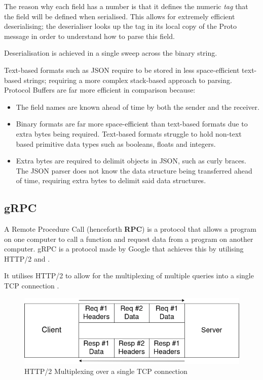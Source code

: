 \documentclass[a4paper,12pt]{report}
\begin{document}
The reason why each field has a number is that it defines the numeric \textit{tag} that the field will be defined when serialised.
This allows for extremely efficient deserialising; the deserialiser looks up the tag in its local copy of the Proto message in order
to understand how to parse this field. 

Deserialisation is achieved in a single sweep across the binary string.

Text-based formats such as JSON \cite{json} require to be stored in less space-efficient text-based strings; requiring a more complex stack-based approach to parsing. 
Protocol Buffers are far more efficient in comparison because:

\begin{itemize}
    \item The field names are known ahead of time by both the sender and the receiver.
    \item Binary formats are far more space-efficient than text-based formats due to extra bytes being required. Text-based formats struggle to hold non-text based primitive data types such as booleans, floats and integers.
    \item Extra bytes are required to delimit objects in JSON, such as curly braces. The JSON parser does not know the data structure being transferred ahead of time, requiring extra bytes to delimit said data structures.
\end{itemize}

\subsection{gRPC}
\label{sec:grpc}

A Remote Procedure Call (henceforth \textbf{RPC}) is a protocol that allows a program on one computer to call a function and request data from a program on another computer.
gRPC is a protocol made by Google that achieves this by utilising HTTP/2 \cite{http2} and \textit{}.

It utilises HTTP/2 to allow for the multiplexing of multiple queries into a single TCP connection \cite{tcp}.

\begin{figure}[hbt!]
    \centering
    \includegraphics[width=\linewidth]{http2.png}
    \caption{HTTP/2 Multiplexing over a single TCP connection}
    \label{fig:2}
\end{figure}
\end{document}
